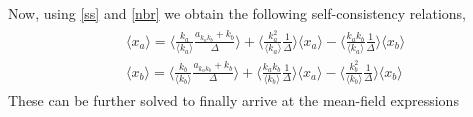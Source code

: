 Now, using \cref{ss} and \cref{nbr} we obtain the following self-consistency relations,
\begin{align}
\begin{aligned}
     & \langle x_{a} \rangle = \langle \frac{k_{a}}{\langle k_{a} \rangle} \frac{a_{k_{a}k_{b}} + k_{b}}{\Delta} \rangle + \langle \frac{k_{a}^2}{\langle k_{a} \rangle} \frac{1}{\Delta} \rangle \langle x_{a} \rangle - \langle \frac{k_{a}k_{b}}{\langle k_{a} \rangle} \frac{1}{\Delta} \rangle \langle x_{b} \rangle 
     \\ 
     & \langle x_{b} \rangle = \langle \frac{k_{b}}{\langle k_{b} \rangle} \frac{a_{k_{a}k_{b}} + k_{b}}{\Delta} \rangle + \langle \frac{k_{a}k_{b}}{\langle k_{b} \rangle} \frac{1}{\Delta} \rangle \langle x_{a} \rangle - \langle \frac{k_{b}^2}{\langle k_{b} \rangle} \frac{1}{\Delta} \rangle \langle x_{b} \rangle
\end{aligned}
\end{align}
These can be further solved to finally arrive at the mean-field expressions 
